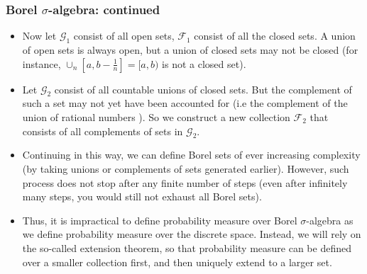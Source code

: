 \documentclass[handout]{beamer}
\begin{document}
\frame
{
  \frametitle{Borel $\sigma$-algebra: continued}

   \begin{itemize}

      
       \item<1->  Now let $\mathcal{G}_1$ consist of all open sets,  $\mathcal{F}_1$ consist of all the closed sets. A union of open sets is always open, but a union of closed sets may not be closed (for instance, $\cup_n [a,b-\frac{1}{n}]=[a,b)$ is not a closed set). 
       
        \item<2->  Let $\mathcal{G}_2$ consist of all countable unions of closed sets. But the complement of such a set may not yet have been accounted for (i.e  the complement of the union of rational numbers ). So we construct a new collection $\mathcal{F}_2$ that consists of all complements of sets in $\mathcal{G}_2$.
    
            \item<3->  Continuing in this way, we can define Borel sets of ever increasing complexity (by taking unions or complements of sets generated earlier). However, such process does not stop after any finite number of steps (even after infinitely many steps, you would still not exhaust all Borel sets).
           
            \item<4->  Thus, it is impractical to define probability measure over Borel $\sigma$-algebra as we define probability measure over the discrete  space. Instead, we will rely on the so-called extension theorem, so that probability measure can be defined over a smaller collection first, and then uniquely extend to a larger set. 
               
                 \end{itemize}
}
\end{document}
